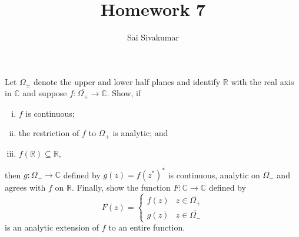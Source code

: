 \documentclass[12pt]{amsart}
\title{Homework 7}
\author{Sai Sivakumar}
\newcommand{\RR}{\mathbb{R}}
\newcommand{\CC}{\mathbb{C}}
\begin{document}
\maketitle

\thispagestyle{empty}
 Let $\Omega_\pm$ denote the upper and lower half planes
 and identify $\RR$ with the real axis in $\CC$ and suppose 
  $f:\overline{\Omega_+}\to \CC.$ Show, if
\begin{enumerate}[(i)]
 \item $f$  is continuous;
 \item the restriction of $f$ to $\Omega_+$ is analytic; and
 \item $f(\RR)\subseteq\RR,$
\end{enumerate} 
  then $g:\overline{\Omega_-}\to \CC$  defined by 
  $g(z)=f(z^*)^*$ is continuous, analytic on $\Omega_-$ and
 agrees with $f$ on $\RR.$ Finally, show the function
 $F:\CC\to \CC$ defined by
\[
 F(z) =\begin{cases} f(z) & z\in \overline{\Omega_+}\\
                     g(z) & z\in \overline{\Omega_-} 
 \end{cases}
\]
 is an analytic extension of $f$ to an entire function.



\bigskip
\end{document}
